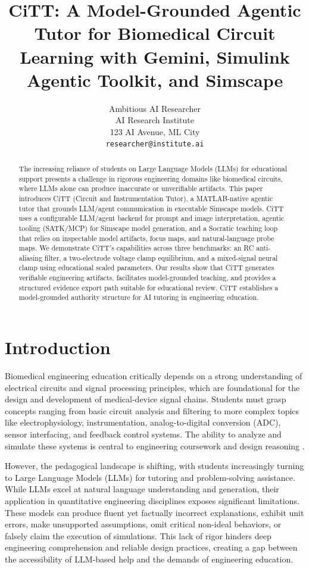\documentclass[10pt,twocolumn,letterpaper]{article}
\title{CiTT: A Model-Grounded Agentic Tutor for Biomedical Circuit Learning with Gemini, Simulink Agentic Toolkit, and Simscape}
\author{Ambitious AI Researcher\\
AI Research Institute\\
123 AI Avenue, ML City\\
{\tt\small researcher@institute.ai}
}
\begin{document}
\maketitle

\begin{abstract}
The increasing reliance of students on Large Language Models (LLMs) for educational support presents a challenge in rigorous engineering domains like biomedical circuits, where LLMs alone can produce inaccurate or unverifiable artifacts. This paper introduces CiTT (Circuit and Instrumentation Tutor), a MATLAB-native agentic tutor that grounds LLM/agent communication in executable Simscape models. CiTT uses a configurable LLM/agent backend for prompt and image interpretation, agentic tooling (SATK/MCP) for Simscape model generation, and a Socratic teaching loop that relies on inspectable model artifacts, focus maps, and natural-language probe maps. We demonstrate CiTT's capabilities across three benchmarks: an RC anti-aliasing filter, a two-electrode voltage clamp equilibrium, and a mixed-signal neural clamp using educational scaled parameters. Our results show that CiTT generates verifiable engineering artifacts, facilitates model-grounded teaching, and provides a structured evidence export path suitable for educational review. CiTT establishes a model-grounded authority structure for AI tutoring in engineering education.
\end{abstract}

\section{Introduction}
\label{sec:intro}
Biomedical engineering education critically depends on a strong understanding of electrical circuits and signal processing principles, which are foundational for the design and development of medical-device signal chains. Students must grasp concepts ranging from basic circuit analysis and filtering to more complex topics like electrophysiology, instrumentation, analog-to-digital conversion (ADC), sensor interfacing, and feedback control systems. The ability to analyze and simulate these systems is central to engineering coursework and design reasoning \cite{webster_medical_instrumentation_2020}.

However, the pedagogical landscape is shifting, with students increasingly turning to Large Language Models (LLMs) for tutoring and problem-solving assistance. While LLMs excel at natural language understanding and generation, their application in quantitative engineering disciplines exposes significant limitations. These models can produce fluent yet factually incorrect explanations, exhibit unit errors, make unsupported assumptions, omit critical non-ideal behaviors, or falsely claim the execution of simulations. This lack of rigor hinders deep engineering comprehension and reliable design practices, creating a gap between the accessibility of LLM-based help and the demands of engineering education.
\end{document}
